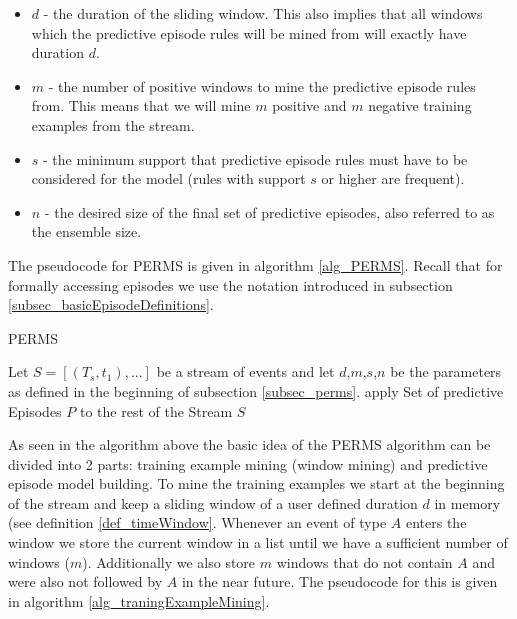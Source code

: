 \begin{itemize}
	\item \textbf{$d$} - the duration of the sliding window. This also implies that all windows which the predictive episode rules will be mined from will exactly have duration $d$.
	\item \textbf{$m$} - the number of positive windows to mine the predictive episode rules from. This means that we will mine $m$ positive and $m$ negative training examples from the stream.
	\item \textbf{$s$} - the minimum support that predictive episode rules must have to be considered for the model (rules with support $s$ or higher are frequent).
	\item \textbf{$n$} - the desired size of the final set of predictive episodes, also referred to as the ensemble size.
\end{itemize}

The pseudocode for PERMS is given in algorithm \ref{alg_PERMS}. Recall that for formally accessing episodes we use the notation introduced in subsection \ref{subsec_basicEpisodeDefinitions}.

\begin{algorithm}[H]
  \caption{PERMS
    \label{alg_PERMS}}
  \begin{algorithmic}[1]
    \Statex
    \Require Let $S=[(T_s,t_1),...]$ be a stream of events and let $d$,$m$,$s$,$n$ be the parameters as defined in the beginning of subsection \ref{subsec_perms}.
      \State apply Set of predictive Episodes $P$ to the rest of the Stream $S$
    \EndFunction
  \end{algorithmic}
\end{algorithm}

As seen in the algorithm above the basic idea of the PERMS algorithm can be divided into 2 parts: training example mining (window mining) and predictive episode model building. To mine the training examples we start at the beginning of the stream and keep a sliding window of a user defined duration $d$ in memory (see definition \ref{def_timeWindow}. Whenever an event of type $A$ enters the window we store the current window in a list until we have a sufficient number of windows ($m$). Additionally we also store $m$ windows that do not contain $A$ and were also not followed by $A$ in the near future. The pseudocode for this is given in algorithm \ref{alg_traningExampleMining}.

